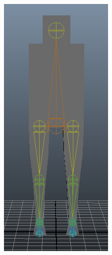 \begin{figure}[htp]
\begin{subfigure}[b]{0.3\textwidth}
		\includegraphics[width=\textwidth]{images/simpleSkeleton2Screen2Cropped.png}

\end{subfigure}
\end{figure}
